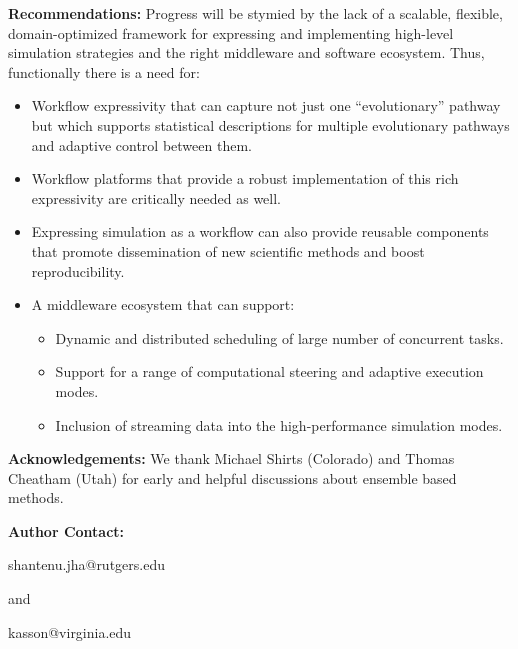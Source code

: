 \documentclass[10pt,letterpaper,draft]{article}
\begin{document}
{\bf Recommendations:} Progress will be stymied by the lack of a scalable, flexible, domain-optimized framework for expressing and implementing high-level simulation strategies and the right middleware and software ecosystem. Thus, functionally there is a need for:
\begin{itemize}
\item Workflow expressivity that can capture not just one “evolutionary” pathway but which supports statistical descriptions for multiple evolutionary pathways and adaptive control between them. 
\item Workflow platforms that provide a robust implementation of this rich expressivity are critically needed as well.
\item Expressing simulation as a workflow can also provide reusable components that promote dissemination of new scientific methods and boost reproducibility.
\item A middleware ecosystem that can support:
\begin{itemize} 
\item Dynamic and distributed scheduling of large number of concurrent tasks.
\item Support for a range of computational steering and adaptive execution modes.
\item Inclusion of streaming data into  the high-performance simulation modes.
\end{itemize}
\end{itemize}

{\bf Acknowledgements:} We thank Michael Shirts (Colorado) and Thomas Cheatham (Utah) for early and helpful discussions about ensemble based methods.

{\bf Author Contact:}

shantenu.jha@rutgers.edu   

and 

kasson@virginia.edu 






\setcounter{page}{1} \pagestyle{plain} 


\end{document}
